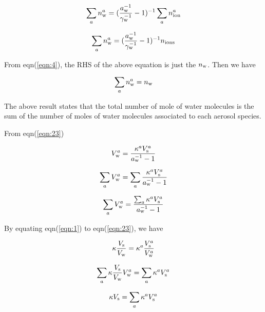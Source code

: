 \documentclass[12pt]{article}
\begin{document}
\begin{equation}
\sum_{a} n_{\rm w}^{a}=(\frac{a_{\rm w}^{-1}}{\gamma_{\rm w}^{-1}}-1)^{-1}\sum_{a}n_{\rm ion}^{a}
\end{equation}

\begin{equation}
\sum_{a} n_{\rm w}^{a}=(\frac{a_{\rm w}^{-1}}{\gamma_{\rm w}^{-1}}-1)^{-1} n_{\rm ions}
\end{equation}

From eqn(\ref{eqn:4}), the RHS of the above equation is just the $n_{\rm w}$. Then we have 

\begin{equation}
\sum_{a} n_{\rm w}^{a}=n_{\rm w}
\end{equation}

The above result states that the total number of mole of water molecules is the sum of the number of moles of water molecules associated to each aerosol species. 


From eqn(\ref{eqn:23})

\begin{equation}
V_{\rm w}^{a}=\frac{\kappa^{a} V_{\rm s}^{a}}{a_{\rm w}^{-1}-1}
\end{equation}

\begin{equation}
\sum_{a}V_{\rm w}^{a}  =\sum_{a}\frac{\kappa^{a} V_{\rm s}^{a}}{a_{\rm w}^{-1}-1}
\end{equation}

\begin{equation}
\sum_{a}V_{\rm w}^{a}  =\frac{\sum_{a}\kappa^{a} V_{\rm s}^{a}}{a_{\rm w}^{-1}-1}
\end{equation}




By equating eqn(\ref{eqn:1}) to eqn(\ref{eqn:23}), we have

\begin{equation}\label{eqn:28}
\kappa \frac{V_{\rm s}}{V_{\rm w}}= \kappa^{a} \frac{V_{\rm s}^{a}}{V_{\rm w}^{a}}
\end{equation}

\begin{equation}\label{eqn:29}
\sum_{a} \kappa \frac{V_{\rm s}}{V_{\rm w}} V_{\rm w}^{a}= \sum_{a} \kappa^{a} V_{\rm s}^{a}
\end{equation}

\begin{equation}\label{eqn:30}
\kappa V_{\rm s}= \sum_{a} \kappa^{a} V_{\rm s}^{a}
\end{equation}
\end{document}
